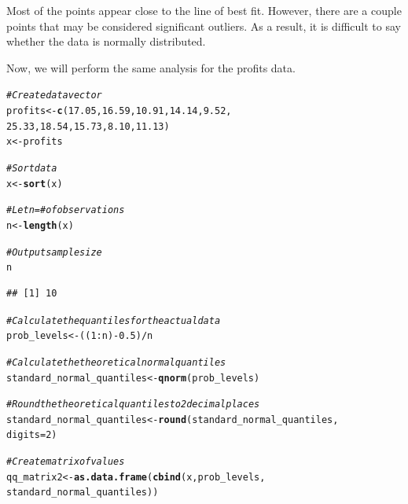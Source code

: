 \documentclass[12pt]{article}\usepackage[]{graphicx}\usepackage[]{color}
\makeatletter
\newcommand{\hlnum}[1]{\textcolor[rgb]{0.686,0.059,0.569}{#1}}%
\newcommand{\hlcom}[1]{\textcolor[rgb]{0.678,0.584,0.686}{\textit{#1}}}%
\newcommand{\hlopt}[1]{\textcolor[rgb]{0,0,0}{#1}}%
\newcommand{\hlstd}[1]{\textcolor[rgb]{0.345,0.345,0.345}{#1}}%
\newcommand{\hlkwb}[1]{\textcolor[rgb]{0.69,0.353,0.396}{#1}}%
\newcommand{\hlkwc}[1]{\textcolor[rgb]{0.333,0.667,0.333}{#1}}%
\newcommand{\hlkwd}[1]{\textcolor[rgb]{0.737,0.353,0.396}{\textbf{#1}}}%
\newenvironment{kframe}{%
 \def\at@end@of@kframe{}%
 \ifinner\ifhmode%
  \def\at@end@of@kframe{\end{minipage}}%
  \begin{minipage}{\columnwidth}%
 \fi\fi%
 \def\FrameCommand##1{\hskip\@totalleftmargin \hskip-\fboxsep
 \colorbox{shadecolor}{##1}\hskip-\fboxsep
     \hskip-\linewidth \hskip-\@totalleftmargin \hskip\columnwidth}%
 \MakeFramed {\advance\hsize-\width
   \@totalleftmargin\z@ \linewidth\hsize
   \@setminipage}}%
 {\par\unskip\endMakeFramed%
 \at@end@of@kframe}
\newenvironment{knitrout}{}{} %
\makeatother
\begin{document}
\begin{enumerate}[a)]
\begin{knitrout}
\end{knitrout}

Most of the points appear close to the line of best fit. However, there are a couple points that may be considered significant outliers. As a result, it is difficult to say whether the data is normally distributed.

Now, we will perform the same analysis for the profits data.

\begin{knitrout}
\color{fgcolor}\begin{kframe}
\begin{alltt}
\hlcom{#Create data vector}
\hlstd{profits} \hlkwb{<-} \hlkwd{c}\hlstd{(}\hlnum{17.05}\hlstd{,} \hlnum{16.59}\hlstd{,} \hlnum{10.91}\hlstd{,} \hlnum{14.14}\hlstd{,} \hlnum{9.52}\hlstd{,}
             \hlnum{25.33}\hlstd{,} \hlnum{18.54}\hlstd{,} \hlnum{15.73}\hlstd{,} \hlnum{8.10}\hlstd{,} \hlnum{11.13}\hlstd{)}
\hlstd{x} \hlkwb{<-} \hlstd{profits}

\hlcom{#Sort data}
\hlstd{x} \hlkwb{<-} \hlkwd{sort}\hlstd{(x)}

\hlcom{#Let n = # of observations}
\hlstd{n} \hlkwb{<-} \hlkwd{length}\hlstd{(x)}

\hlcom{#Output sample size}
\hlstd{n}
\end{alltt}
\begin{verbatim}
## [1] 10
\end{verbatim}
\begin{alltt}
\hlcom{#Calculate the quantiles for the actual data}
\hlstd{prob_levels} \hlkwb{<-} \hlstd{((}\hlnum{1}\hlopt{:}\hlstd{n)}\hlopt{-}\hlnum{0.5}\hlstd{)}\hlopt{/}\hlstd{n}

\hlcom{#Calculate the theoretical normal quantiles}
\hlstd{standard_normal_quantiles} \hlkwb{<-} \hlkwd{qnorm}\hlstd{(prob_levels)}

\hlcom{#Round the theoretical quantiles to 2 decimal places}
\hlstd{standard_normal_quantiles} \hlkwb{<-} \hlkwd{round}\hlstd{(standard_normal_quantiles,}
                                   \hlkwc{digits} \hlstd{=} \hlnum{2}\hlstd{)}

\hlcom{#Create matrix of values}
\hlstd{qq_matrix2} \hlkwb{<-} \hlkwd{as.data.frame}\hlstd{(}\hlkwd{cbind}\hlstd{(x, prob_levels,}
                                 \hlstd{standard_normal_quantiles))}


\end{alltt}
\end{kframe}
\end{knitrout}
\end{enumerate}
\end{document}
